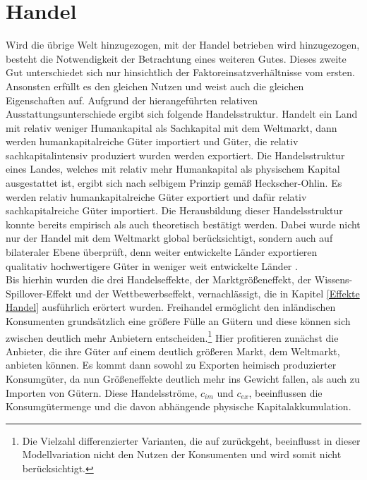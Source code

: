 \section{Handel}
Wird die übrige Welt hinzugezogen, mit der Handel betrieben wird hinzugezogen, besteht die Notwendigkeit der Betrachtung eines weiteren Gutes. Dieses zweite Gut unterschiedet sich nur hinsichtlich der Faktoreinsatzverhältnisse vom ersten. Ansonsten erfüllt es den gleichen Nutzen und weist auch die gleichen Eigenschaften auf. 
Aufgrund der hierangeführten relativen Ausstattungsunterschiede ergibt sich folgende Handelsstruktur. Handelt ein Land mit relativ weniger Humankapital als Sachkapital mit dem Weltmarkt, dann werden humankapitalreiche Güter importiert und Güter, die relativ sachkapitalintensiv produziert wurden werden exportiert. Die Handelsstruktur eines Landes, welches mit relativ  mehr Humankapital als physischem Kapital ausgestattet ist, ergibt sich nach selbigem Prinzip gemä{\ss} Heckscher-Ohlin. Es werden relativ humankapitalreiche Güter exportiert und dafür relativ sachkapitalreiche Güter importiert. Die Herausbildung dieser Handelsstruktur konnte bereits empirisch als auch theoretisch bestätigt werden. Dabei wurde nicht nur der Handel mit dem Weltmarkt global berücksichtigt, sondern auch auf bilateraler Ebene überprüft, denn weiter entwickelte L{\"a}nder exportieren qualitativ hochwertigere G{\"u}ter in weniger weit entwickelte L{\"a}nder \citep{Fajgelbaum.2011}.\\
Bis hierhin wurden die drei Handelseffekte, der Marktgrö{\ss}eneffekt, der Wissens-Spillover-Effekt und der Wettbewerbseffekt, vernachlässigt, die in Kapitel \ref{Effekte Handel} ausführlich erörtert wurden.
Freihandel ermöglicht den inländischen Konsumenten grundsätzlich eine grö{\ss}ere Fülle an Gütern und diese können sich zwischen deutlich mehr Anbietern entscheiden.\footnote{Die Vielzahl differenzierter Varianten, die auf \citet{Krugman.79} zurückgeht, beeinflusst in dieser Modellvariation nicht den Nutzen der Konsumenten und wird somit nicht berücksichtigt.} Hier profitieren zunächst die Anbieter, die ihre Güter auf einem deutlich grö{\ss}eren Markt, dem Weltmarkt, anbieten können. Es kommt dann sowohl zu Exporten heimisch produzierter Konsumgüter, da nun Grö{\ss}eneffekte deutlich mehr ins Gewicht fallen, als auch zu Importen von Gütern. Diese Handelsströme, $c_{im}$ und $c_{ex}$, beeinflussen die Konsumgütermenge und die davon abhängende physische Kapitalakkumulation.\\ 
